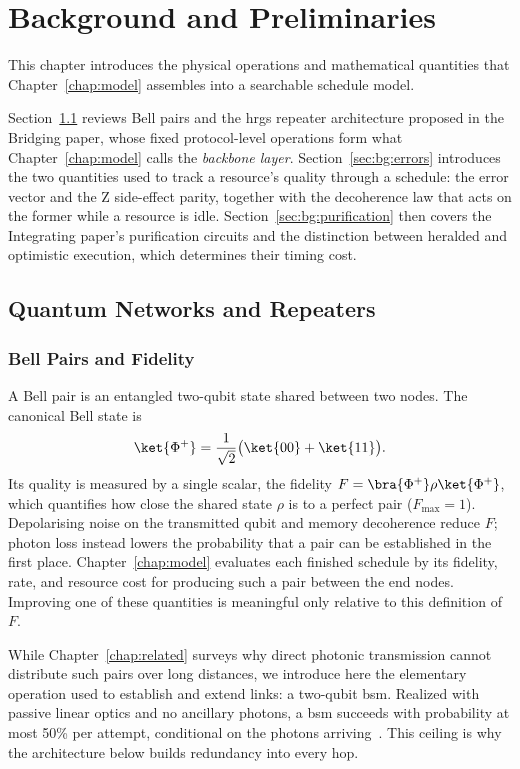 \chapter{Background and Preliminaries}
\label{chap:background}

This chapter introduces the physical operations and mathematical quantities that Chapter~\ref{chap:model} assembles into a searchable schedule model.

Section~\ref{sec:bg:networks} reviews Bell pairs and the \Gls{hrgs} repeater architecture proposed in the Bridging paper, whose fixed protocol-level operations form what Chapter~\ref{chap:model} calls the \emph{backbone layer}. Section~\ref{sec:bg:errors} introduces the two quantities used to track a resource's quality through a schedule: the error vector and the Z side-effect parity, together with the decoherence law that acts on the former while a resource is idle. Section~\ref{sec:bg:purification} then covers the Integrating paper's purification circuits and the distinction between heralded and optimistic execution, which determines their timing cost.

\section{Quantum Networks and Repeaters}
\label{sec:bg:networks}

\subsection{Bell Pairs and Fidelity}
\label{sec:bg:bellpairs}

A Bell pair is an entangled two-qubit state shared between two nodes. The canonical Bell state is
\[
    \ket{\Phi^+} = \frac{1}{\sqrt{2}}\bigl(\ket{00} + \ket{11}\bigr).
\]
Its quality is measured by a single scalar, the fidelity $F = \bra{\Phi^+}\rho\ket{\Phi^+}$, which quantifies how close the shared state $\rho$ is to a perfect pair ($F_\text{max}=1$). Depolarising noise on the transmitted qubit and memory decoherence reduce $F$; photon loss instead lowers the probability that a pair can be established in the first place. Chapter~\ref{chap:model} evaluates each finished schedule by its fidelity, rate, and resource cost for producing such a pair between the end nodes. Improving one of these quantities is meaningful only relative to this definition of $F$.


While Chapter~\ref{chap:related} surveys why direct photonic transmission cannot distribute such pairs over long distances, we introduce here the elementary operation used to establish and extend links: a two-qubit \Gls{bsm}. Realized with passive linear optics and no ancillary photons, a \Gls{bsm} succeeds with probability at most 50\% per attempt, conditional on the photons arriving~\cite{Ewert20143,Benchasattabuse2026Bridging}. This ceiling is why the architecture below builds redundancy into every hop.

